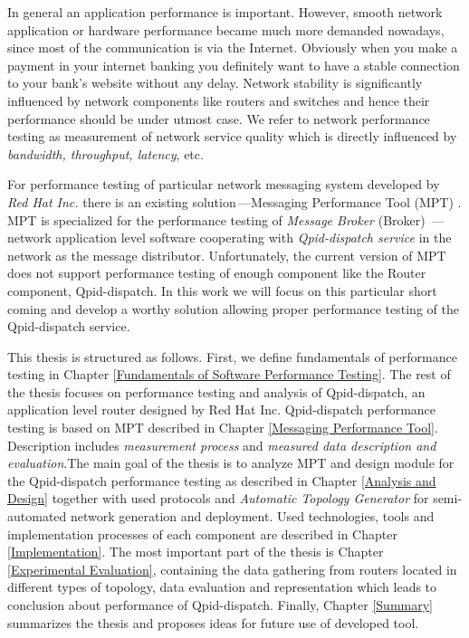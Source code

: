 In general an application performance is important. However, smooth network application or hardware performance became much more demanded nowadays, since most of the communication is via the Internet.  Obviously when you make a payment in your internet banking you definitely want to have a stable connection to your bank's website without any delay. Network stability is significantly influenced by network components like routers and switches and hence their performance should be under utmost case. We refer to network performance testing as measurement of network service quality which is directly influenced by \emph{bandwidth, throughput, latency}, etc.

For performance testing of particular network messaging system developed by \emph{Red Hat Inc.} there is an existing solution\,---Messaging Performance Tool (MPT) \cite{ORPISKE:MSGPT}. MPT is specialized for the performance testing of \emph{Message Broker} (Broker) \cite{RH:Broker}\,---\,network application level software cooperating with \emph{Qpid-dispatch service} \cite{RH:Interconnect} in the network as the message distributor. Unfortunately, the current version of MPT does not support performance testing of enough component like the Router component, Qpid-dispatch. In this work we will focus on this particular short coming and develop a worthy solution allowing proper performance testing of the Qpid-dispatch service.

This thesis is structured as follows. First, we define fundamentals of performance testing in Chapter \ref{Fundamentals of Software Performance Testing}. The rest of the thesis focuses on performance testing and analysis of Qpid-dispatch, an application level router designed by Red Hat Inc. Qpid-dispatch performance testing is based on MPT described in Chapter \ref{Messaging Performance Tool}. Description includes \emph{measurement process} and \emph{measured data description and evaluation}.The main goal of the thesis is to analyze MPT and design module for the Qpid-dispatch performance testing as described in Chapter \ref{Analysis and Design} together with used protocols and \emph{Automatic Topology Generator} for semi-automated network generation and deployment. Used technologies, tools and  implementation processes of each component are described in Chapter \ref{Implementation}. The most important part of the thesis is Chapter \ref{Experimental Evaluation}, containing the data gathering  from routers located in different types of topology, data evaluation and representation which leads to conclusion about performance of Qpid-dispatch. Finally, Chapter \ref{Summary} summarizes the thesis and proposes ideas for future use of developed tool.

